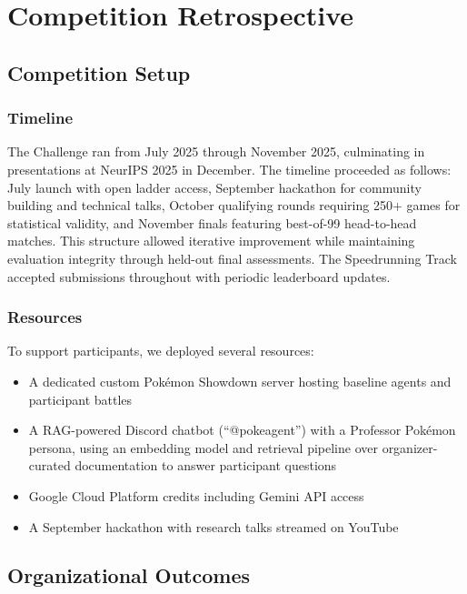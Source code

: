 \section{Competition Retrospective}
\label{sec:competition-retrospective}

\subsection{Competition Setup}

\subsubsection{Timeline}

The \pokeagent Challenge ran from July 2025 through November 2025, culminating in presentations at NeurIPS 2025 in December. The timeline proceeded as follows: July launch with open ladder access, September hackathon for community building and technical talks, October qualifying rounds requiring 250+ games for statistical validity, and November finals featuring best-of-99 head-to-head matches. This structure allowed iterative improvement while maintaining evaluation integrity through held-out final assessments. The Speedrunning Track accepted submissions throughout with periodic leaderboard updates.

\subsubsection{Resources}

To support participants, we deployed several resources:
\begin{itemize}
    \item A dedicated custom Pokémon Showdown server hosting baseline agents and participant battles
    \item A RAG-powered Discord chatbot (``@pokeagent'') with a Professor Pokémon persona, using an embedding model and retrieval pipeline over organizer-curated documentation to answer participant questions
    \item Google Cloud Platform credits including Gemini API access
    \item A September hackathon with research talks streamed on YouTube
\end{itemize}

\subsection{Organizational Outcomes}


